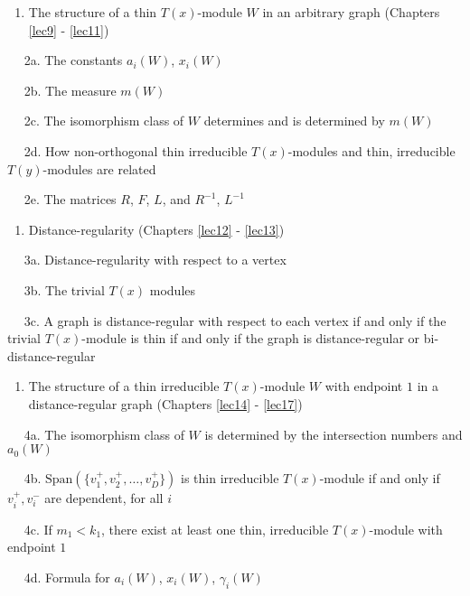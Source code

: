 \documentclass[
]{book}
\providecommand{\tightlist}{%
  \setlength{\itemsep}{0pt}\setlength{\parskip}{0pt}}
\theoremstyle{definition}
\theoremstyle{definition}
\theoremstyle{definition}
\theoremstyle{definition}
\theoremstyle{remark}
\begin{document}
\begin{enumerate}
\def\labelenumi{\arabic{enumi}.}
\setcounter{enumi}{1}
\tightlist
\item
  The structure of a thin \(T(x)\)-module \(W\) in an arbitrary graph (Chapters \ref{lec9} - \ref{lec11})
\end{enumerate}

\(\quad\) 2a. The constants \(a_i(W)\), \(x_i(W)\)

\(\quad\) 2b. The measure \(m(W)\)

\(\quad\) 2c. The isomorphism class of \(W\) determines and is determined by \(m(W)\)

\(\quad\) 2d. How non-orthogonal thin irreducible \(T(x)\)-modules and thin, irreducible \(T(y)\)-modules are related

\(\quad\) 2e. The matrices \(R\), \(F\), \(L\), and \(R^{-1}\), \(L^{-1}\)

\begin{enumerate}
\def\labelenumi{\arabic{enumi}.}
\setcounter{enumi}{2}
\tightlist
\item
  Distance-regularity (Chapters \ref{lec12} - \ref{lec13})
\end{enumerate}

\(\quad\) 3a. Distance-regularity with respect to a vertex

\(\quad\) 3b. The trivial \(T(x)\) modules

\(\quad\) 3c. A graph is distance-regular with respect to each vertex if and only if the trivial \(T(x)\)-module is thin if and only if the graph is distance-regular or bi-distance-regular

\begin{enumerate}
\def\labelenumi{\arabic{enumi}.}
\setcounter{enumi}{3}
\tightlist
\item
  The structure of a thin irreducible \(T(x)\)-module \(W\) with endpoint \(1\) in a distance-regular graph (Chapters \ref{lec14} - \ref{lec17})
\end{enumerate}

\(\quad\) 4a. The isomorphism class of \(W\) is determined by the intersection numbers and \(a_0(W)\)

\(\quad\) 4b. \(\mathrm{Span}(\{v_1^+, v_2^+, \ldots, v^+_D\})\) is thin irreducible \(T(x)\)-module if and only if \(v^+_i, v^-_i\) are dependent, for all \(i\)

\(\quad\) 4c. If \(m_1 < k_1\), there exist at least one thin, irreducible \(T(x)\)-module with endpoint \(1\)

\(\quad\) 4d. Formula for \(a_i(W)\), \(x_i(W)\), \(\gamma_i(W)\)
\end{document}
